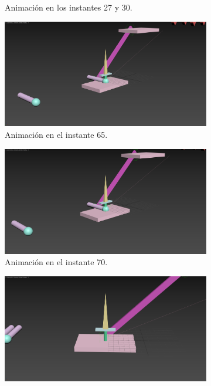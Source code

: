 \begin{figure}[H]
\begin{subfigure}[t]{0.48\textwidth}
        \caption{Animación en los instantes 27 y 30.}
    \end{subfigure}
    \hfill
    \begin{subfigure}[t]{0.48\textwidth}
        \centering
        \includegraphics[width=\textwidth]{imagenes/resultado/65.png}
        \caption{Animación en el instante 65.}
    \end{subfigure}
    \hfill
    \begin{subfigure}[t]{0.48\textwidth}
        \centering
        \includegraphics[width=\textwidth]{imagenes/resultado/70.png}
        \caption{Animación en el instante 70.}
    \end{subfigure}
    \hfill
    \begin{subfigure}[t]{0.48\textwidth}
        \centering
        \includegraphics[width=\textwidth]{imagenes/resultado/90.png}

\end{subfigure}
\end{figure}
